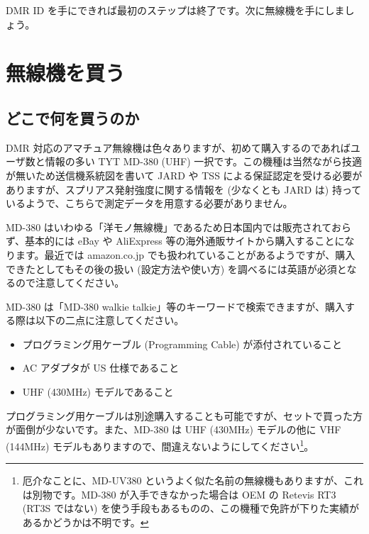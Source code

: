 \documentclass[a4j,oneside]{ujbook}
\begin{document}
DMR ID を手にできれば最初のステップは終了です。次に無線機を手にしましょう。

\chapter{無線機を買う}

\section{どこで何を買うのか}

DMR 対応のアマチュア無線機は色々ありますが、初めて購入するのであればユーザ数と情報の多い TYT MD-380 (UHF) 一択です。この機種は当然ながら技適が無いため送信機系統図を書いて JARD や TSS による保証認定を受ける必要がありますが、スプリアス発射強度に関する情報を (少なくとも JARD は) 持っているようで、こちらで測定データを用意する必要がありません。

MD-380 はいわゆる「洋モノ無線機」であるため日本国内では販売されておらず、基本的には eBay や AliExpress 等の海外通販サイトから購入することになります。最近では amazon.co.jp でも扱われていることがあるようですが、購入できたとしてもその後の扱い (設定方法や使い方) を調べるには英語が必須となるので注意してください。

MD-380 は「MD-380 walkie talkie」等のキーワードで検索できますが、購入する際は以下の二点に注意してください。
\begin{itemize}
 \item プログラミング用ケーブル (Programming Cable) が添付されていること
 \item AC アダプタが US 仕様であること
 \item UHF (430MHz) モデルであること
\end{itemize}
プログラミング用ケーブルは別途購入することも可能ですが、セットで買った方が面倒が少ないです。また、MD-380 は UHF (430MHz) モデルの他に VHF (144MHz) モデルもありますので、間違えないようにしてください\footnote{厄介なことに、MD-UV380 というよく似た名前の無線機もありますが、これは別物です。MD-380 が入手できなかった場合は OEM の Retevis RT3 (RT3S ではない) を使う手段もあるものの、この機種で免許が下りた実績があるかどうかは不明です。}。
\end{document}
